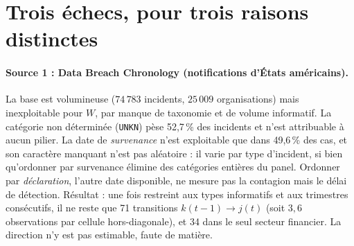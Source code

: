 \section{Trois échecs, pour trois raisons distinctes}

\paragraph{Source 1 : Data Breach Chronology (notifications d'États américains).}
La base est volumineuse ($74\,783$ incidents, $25\,009$ organisations) mais inexploitable
pour $W$, par manque de taxonomie et de volume informatif. La catégorie
non déterminée (\texttt{UNKN}) pèse 52,7\,\% des incidents et n'est attribuable à
aucun pilier. La date de \emph{survenance} n'est exploitable que dans 49,6\,\% des
cas, et son caractère manquant n'est pas aléatoire : il varie par type d'incident, si bien
qu'ordonner par survenance élimine des catégories entières du panel. Ordonner par
\emph{déclaration}, l'autre date disponible, ne mesure pas la contagion mais le
délai de détection. Résultat : une fois restreint aux types informatifs et aux
trimestres consécutifs, il ne reste que 71 transitions $k(t\!-\!1)\to j(t)$ (soit
$3{,}6$ observations par cellule hors-diagonale), et 34 dans le seul secteur
financier. La direction n'y est pas estimable, faute de matière.

